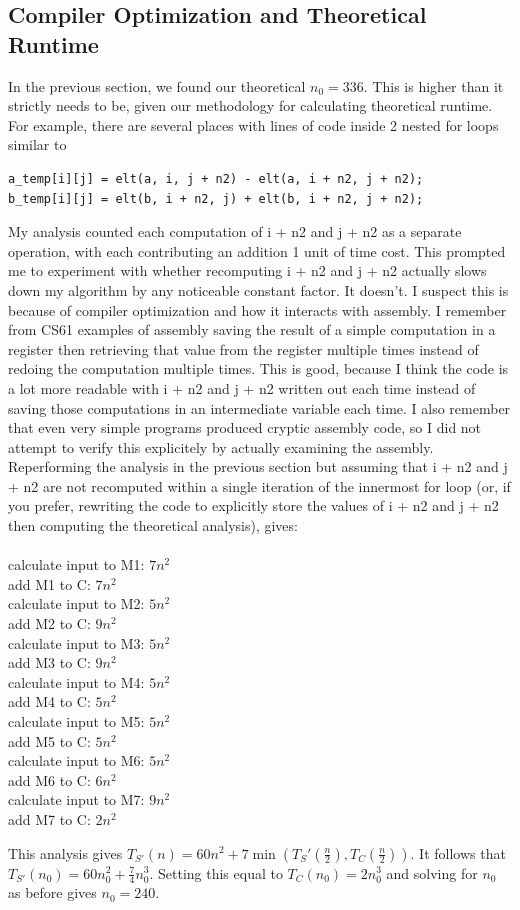 \documentclass{article}
\begin{document}
\subsection*{Compiler Optimization and Theoretical Runtime}
In the previous section, we found our theoretical $n_0 = 336$. This is higher than it strictly needs to be, given our methodology for calculating theoretical runtime. For example, there are several places with lines of code inside 2 nested for loops similar to

\begin{verbatim}
a_temp[i][j] = elt(a, i, j + n2) - elt(a, i + n2, j + n2);
b_temp[i][j] = elt(b, i + n2, j) + elt(b, i + n2, j + n2);
\end{verbatim}

My analysis counted each computation of i + n2 and j + n2 as a separate operation, with each contributing an addition 1 unit of time cost. This prompted me to experiment with whether recomputing i + n2 and j + n2 actually slows down my algorithm by any noticeable constant factor. It doesn't. I suspect this is because of compiler optimization and how it interacts with assembly. I remember from CS61 examples of assembly saving the result of a simple computation in a register then retrieving that value from the register multiple times instead of redoing the computation multiple times. This is good, because I think the code is a lot more readable with i + n2 and j + n2 written out each time instead of saving those computations in an intermediate variable each time.  I also remember that even very simple programs produced cryptic assembly code, so I did not attempt to verify this explicitely by actually examining the assembly. Reperforming the analysis in the previous section but assuming that i + n2 and j + n2 are not recomputed within a single iteration of the innermost for loop (or, if you prefer, rewriting the code to explicitly store the values of i + n2 and j + n2 then computing the theoretical analysis), gives:\\\\
calculate input to M1: $7n^2$\\
add M1 to C: $7 n^2$\\
calculate input to M2: $5n^2$\\
add M2 to C: $9n^2$\\
calculate input to M3: $5n^2$\\
add M3 to C: $9 n^2$\\
calculate input to M4: $5n^2$\\
add M4 to C: $5n^2$\\
calculate input to M5: $5n^2$\\
add M5 to C: $5 n^2$\\
calculate input to M6: $5 n^2$\\
add M6 to C: $6 n^2$\\
calculate input to M7: $9 n^2$\\
add M7 to C: $2n^2$

This analysis gives $T_{S'}(n) = 60 n^2 + 7 \min(T_S'(\frac{n}{2}), T_C(\frac{n}{2}))$. It follows that $T_{S'} (n_0) = 60 n_0^2 + \frac{7}{4} n_0^3$. Setting this equal to $T_C(n_0) = 2 n_0^3$ and solving for $n_0$ as before gives $n_0 = 240$. 
\end{document}
